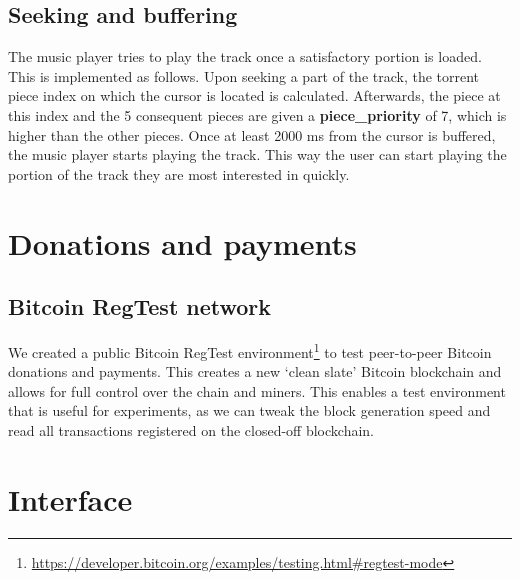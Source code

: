 \subsection{Seeking and buffering}
The music player tries to play the track once a satisfactory portion is loaded. This is implemented as follows. Upon seeking a part of the track, the torrent piece index on which the cursor is located is calculated. Afterwards, the piece at this index and the 5 consequent pieces are given a \textbf{piece\_priority} of 7, which is higher than the other pieces. Once at least 2000 ms from the cursor is buffered, the music player starts playing the track. This way the user can start playing the portion of the track they are most interested in quickly.
\section{Donations and payments}
\subsection{Bitcoin RegTest network}
We created a public Bitcoin RegTest environment\footnote{\url{https://developer.bitcoin.org/examples/testing.html\#regtest-mode}} to test peer-to-peer Bitcoin donations and payments. This creates a new `clean slate' Bitcoin blockchain and allows for full control over the chain and miners. This enables a test environment that is useful for experiments, as we can tweak the block generation speed and read all transactions registered on the closed-off blockchain.
\label{sec:regtest-network-impl}
\section{Interface}
